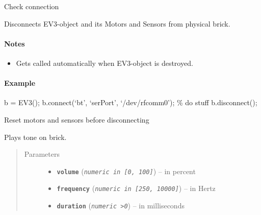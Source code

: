 \documentclass[letterpaper,10pt,english]{sphinxmanual}
\begin{document}
\begin{fulllineitems}
\begin{fulllineitems}
Check connection

\end{fulllineitems}


\begin{fulllineitems}
\label{source:source.EV3.disconnect}
Disconnects EV3-object and its Motors and Sensors from physical brick.
\paragraph{Notes}
\begin{itemize}
\item {} 
Gets called automatically when EV3-object is destroyed.

\end{itemize}
\paragraph{Example}

b = EV3();
b.connect(`bt', `serPort', `/dev/rfcomm0');
\% do stuff
b.disconnect();

Reset motors and sensors before disconnecting

\end{fulllineitems}


\begin{fulllineitems}
\label{source:source.EV3.playTone}
Plays tone on brick.
\begin{quote}\begin{description}
\item[{Parameters}] \leavevmode\begin{itemize}
\item {} 
\textbf{\texttt{volume}} (\emph{\texttt{numeric in {[}0, 100{]}}}) -- in percent

\item {} 
\textbf{\texttt{frequency}} (\emph{\texttt{numeric in {[}250, 10000{]}}}) -- in Hertz

\item {} 
\textbf{\texttt{duration}} (\emph{\texttt{numeric \textgreater{}0}}) -- in milliseconds

\end{itemize}


\end{description}
\end{quote}
\end{fulllineitems}
\end{fulllineitems}
\end{document}
